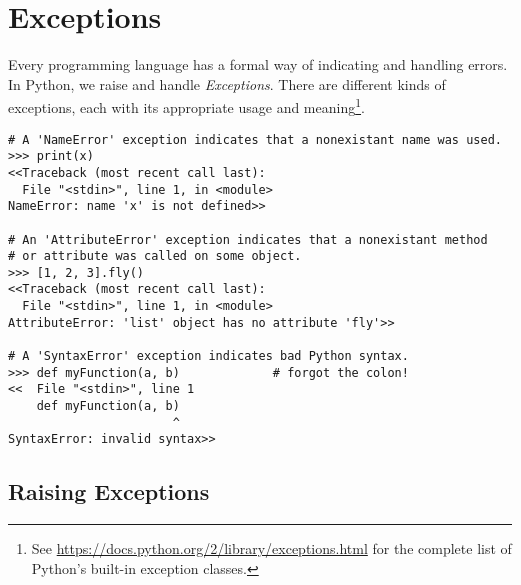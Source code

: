 \label{lab:Exceptions}




\section*{Exceptions}

Every programming language has a formal way of indicating and handling errors.
In Python, we raise and handle \emph{Exceptions}.
There are different kinds of exceptions, each with its appropriate usage and meaning\footnote{See \url{https://docs.python.org/2/library/exceptions.html} for the complete list of Python's built-in exception classes.}.

\begin{lstlisting}
# A 'NameError' exception indicates that a nonexistant name was used.
>>> print(x)
<<Traceback (most recent call last):
  File "<stdin>", line 1, in <module>
NameError: name 'x' is not defined>>

# An 'AttributeError' exception indicates that a nonexistant method
# or attribute was called on some object.
>>> [1, 2, 3].fly()
<<Traceback (most recent call last):
  File "<stdin>", line 1, in <module>
AttributeError: 'list' object has no attribute 'fly'>>

# A 'SyntaxError' exception indicates bad Python syntax.
>>> def myFunction(a, b)             # forgot the colon!
<<  File "<stdin>", line 1
    def myFunction(a, b)
                       ^
SyntaxError: invalid syntax>>
\end{lstlisting}

\subsection*{Raising Exceptions}

